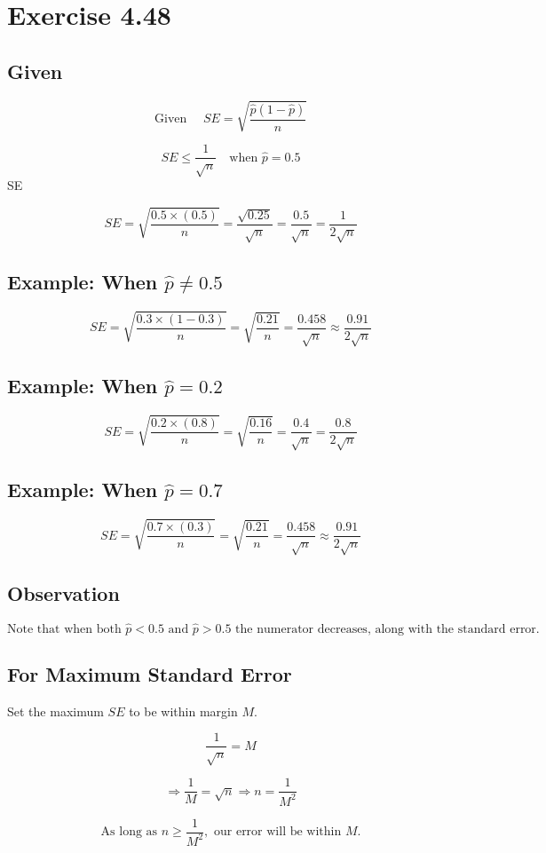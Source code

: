 \documentclass{article}
\begin{document}
\section*{Exercise 4.48}

\subsection*{Given}

\[
\text{Given } \quad SE = \sqrt{\frac{\hat{p}(1 - \hat{p})}{n}}
\]

$$ SE \leq \frac{1}{\sqrt{n}} \quad \text{when } \hat{p} = 0.5 $$ \Rightarrow SE 

\[
SE = \sqrt{\frac{0.5 \times (0.5)}{n}} = \frac{\sqrt{0.25}}{\sqrt{n}} = \frac{0.5}{\sqrt{n}} = \frac{1}{2 \sqrt{n}}
\]

\subsection*{Example: When $\hat{p} \neq 0.5$}
\[
SE = \sqrt{\frac{0.3 \times (1 - 0.3)}{n}} = \sqrt{\frac{0.21}{n}} = \frac{0.458}{\sqrt{n}} \approx \frac{0.91}{2\sqrt{n}}
\]

\subsection*{Example: When $\hat{p} = 0.2$}
\[
SE = \sqrt{\frac{0.2 \times (0.8)}{n}} = \sqrt{\frac{0.16}{n}} = \frac{0.4}{\sqrt{n}} = \frac{0.8}{2\sqrt{n}}
\]

\subsection*{Example: When $\hat{p} = 0.7$}
\[
SE = \sqrt{\frac{0.7 \times (0.3)}{n}} = \sqrt{\frac{0.21}{n}} = \frac{0.458}{\sqrt{n}} \approx \frac{0.91}{2\sqrt{n}}
\]

\subsection*{Observation}
\[
\text{Note that when both } \hat{p} < 0.5 \text{ and } \hat{p} > 0.5 \text{ the numerator decreases, along with the standard error.}
\]

\subsection*{For Maximum Standard Error}
Set the maximum $SE$ to be within margin $M$.

\[
\frac{1}{\sqrt{n}} = M
\]

\[
\Rightarrow \frac{1}{M} = \sqrt{n} \Rightarrow n = \frac{1}{M^2}
\]

\[
\text{As long as } n \geq \frac{1}{M^2}, \text{ our error will be within } M.
\]
\end{document}
